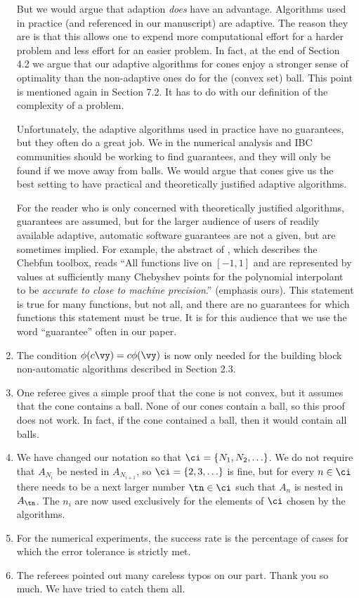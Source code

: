 \documentclass[11pt]{article}
\begin{document}
\begin{enumerate}
But we would argue that adaption \emph{does} have an advantage.  Algorithms used in practice (and referenced in our manuscript) are adaptive.  The reason they are is that this allows one to expend more computational effort for a harder problem and less effort for an easier problem.  In fact, at the end of Section 4.2 we argue that our adaptive algorithms for cones enjoy a stronger sense of optimality than the non-adaptive ones do for the (convex set) ball. This point is mentioned again in Section 7.2.  It has to do with our definition of the complexity of a problem. 

Unfortunately, the adaptive algorithms used in practice have no guarantees, but they often do a great job.  We in the numerical analysis and IBC communities should be working to find guarantees, and they will only be found if we move away from balls.  We would argue that cones give us the best setting to have practical and theoretically justified adaptive algorithms.  

For the reader who is only concerned with theoretically justified algorithms, guarantees are assumed, but for the larger audience of users of readily available adaptive, automatic software guarantees are not a given, but are sometimes implied.  For example, the abstract of \cite{BatTre04a}, which describes the Chebfun toolbox, reads ``All functions live on $[-1,1]$ and are represented by values at sufficiently many Chebyshev points for the polynomial interpolant to be \emph{accurate to close to machine precision}.''  (emphasis ours).  This statement is true for many functions, but not all, and there are no guarantees for which functions this statement must be true.  It is for this audience that we use the word ``guarantee'' often in our paper.

\item The condition $\phi(c\vy) = c\phi(\vy)$ is now only needed for the building block non-automatic algorithms described in Section 2.3.

\item One referee gives a simple proof that the cone is not convex, but it assumes that the cone contains a ball.  None of our cones contain a ball, so this proof does not work.  In fact, if the cone contained a ball, then it would contain all balls.

\item We have changed our notation so that $\ci=\{N_1, N_2, \ldots \}$.  We do not require that $A_{N_i}$ be nested in $A_{N_{i+1}}$, so $\ci=\{2,3, \ldots\}$ is fine, but for every $n \in \ci$ there needs to be a next larger number $\tn \in \ci$ such that $A_n$ is nested in $A_{\tn}$.  The $n_i$ are now used exclusively for the elements of $\ci$ chosen by the algorithms.

\item For the numerical experiments, the success rate is the percentage of cases for which the error tolerance is strictly met.  

\item The referees pointed out many careless typos on our part.  Thank you so much.  We have tried to catch them all.

\end{enumerate}
\end{document}
